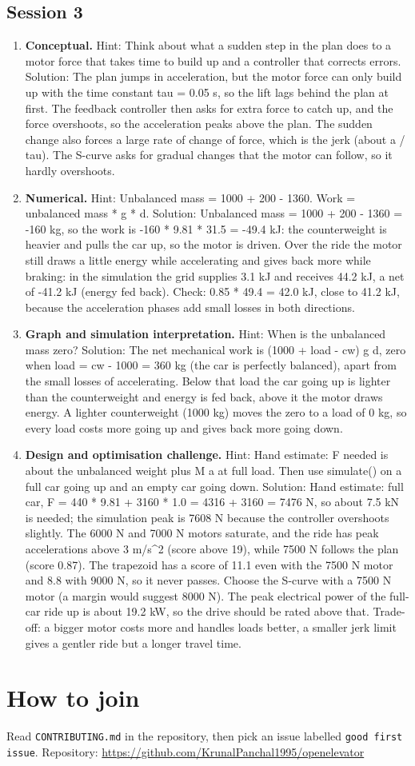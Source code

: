 \documentclass[11pt,a4paper]{article}
\begin{document}
\subsection*{Session 3}
\begin{enumerate}[nosep]
\item \textbf{Conceptual.} Hint: Think about what a sudden step in the plan does to a motor force that takes time to build up and a controller that corrects errors. Solution: The plan jumps in acceleration, but the motor force can only build up with the time constant tau = 0.05 s, so the lift lags behind the plan at first. The feedback controller then asks for extra force to catch up, and the force overshoots, so the acceleration peaks above the plan. The sudden change also forces a large rate of change of force, which is the jerk (about a / tau). The S-curve asks for gradual changes that the motor can follow, so it hardly overshoots.
\item \textbf{Numerical.} Hint: Unbalanced mass = 1000 + 200 - 1360. Work = unbalanced mass * g * d. Solution: Unbalanced mass = 1000 + 200 - 1360 = -160 kg, so the work is -160 * 9.81 * 31.5 = -49.4 kJ: the counterweight is heavier and pulls the car up, so the motor is driven. Over the ride the motor still draws a little energy while accelerating and gives back more while braking: in the simulation the grid supplies 3.1 kJ and receives 44.2 kJ, a net of -41.2 kJ (energy fed back). Check: 0.85 * 49.4 = 42.0 kJ, close to 41.2 kJ, because the acceleration phases add small losses in both directions.
\item \textbf{Graph and simulation interpretation.} Hint: When is the unbalanced mass zero? Solution: The net mechanical work is (1000 + load - cw) g d, zero when load = cw - 1000 = 360 kg (the car is perfectly balanced), apart from the small losses of accelerating. Below that load the car going up is lighter than the counterweight and energy is fed back, above it the motor draws energy. A lighter counterweight (1000 kg) moves the zero to a load of 0 kg, so every load costs more going up and gives back more going down.
\item \textbf{Design and optimisation challenge.} Hint: Hand estimate: F needed is about the unbalanced weight plus M a at full load. Then use simulate() on a full car going up and an empty car going down. Solution: Hand estimate: full car, F = 440 * 9.81 + 3160 * 1.0 = 4316 + 3160 = 7476 N, so about 7.5 kN is needed; the simulation peak is 7608 N because the controller overshoots slightly. The 6000 N and 7000 N motors saturate, and the ride has peak accelerations above 3 m/s\textasciicircum{}2 (score above 19), while 7500 N follows the plan (score 0.87). The trapezoid has a score of 11.1 even with the 7500 N motor and 8.8 with 9000 N, so it never passes. Choose the S-curve with a 7500 N motor (a margin would suggest 8000 N). The peak electrical power of the full-car ride up is about 19.2 kW, so the drive should be rated above that. Trade-off: a bigger motor costs more and handles loads better, a smaller jerk limit gives a gentler ride but a longer travel time.
\end{enumerate}

\section{How to join}
Read \texttt{CONTRIBUTING.md} in the repository, then pick an issue labelled \texttt{good first issue}. Repository: \url{https://github.com/KrunalPanchal1995/openelevator}
\end{document}
